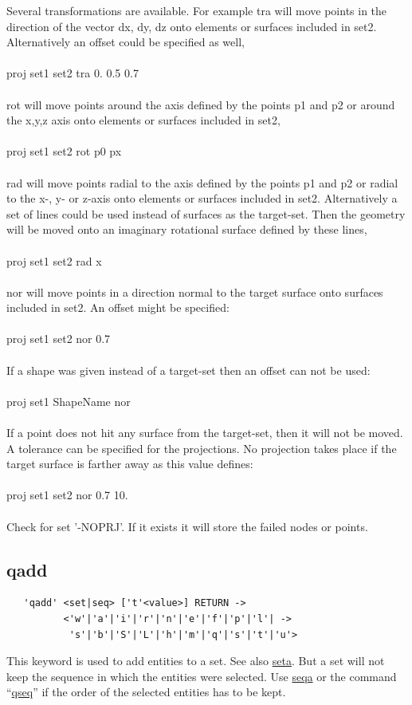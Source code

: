 \documentclass{article}
\providecommand{\htmlref}[2]{\hyperref[#2]{#1}}
\begin{document}
Several transformations are available. For example tra will move points in the direction of the vector dx, dy, dz onto elements or surfaces included in set2. Alternatively an offset could be specified as well,\\\\
proj set1 set2 tra 0. 0.5 0.7  \\\\
rot will move points around the axis defined by the points p1 and p2 or around the x,y,z axis onto elements or surfaces included in set2,\\\\
proj set1 set2 rot p0 px \\\\
rad will move points radial to the axis defined by the points p1 and p2 or radial to the x-, y- or z-axis onto elements or surfaces included in set2. Alternatively a set of lines could be used instead of surfaces as the target-set. Then the geometry will be moved onto an imaginary rotational surface defined by these lines,\\\\
proj set1 set2 rad x \\\\
nor will move points in a direction normal to the target surface onto surfaces included in set2. An offset might be specified:\\\\
proj set1 set2 nor 0.7 \\\\ 
If a shape was given instead of a target-set then an offset can not be used:\\\\
proj set1 ShapeName nor \\\\ 
If a point does not hit any surface from the target-set, then it will not be moved. A tolerance can be specified for the projections. No projection takes place if the target surface is farther away as this value defines:\\\\
proj set1 set2 nor 0.7 10. \\\\

Check for set '-NOPRJ'. If it exists it will store the failed nodes or points.

\subsection{\label{qadd}qadd}
\begin{verbatim}
   'qadd' <set|seq> ['t'<value>] RETURN ->
          <'w'|'a'|'i'|'r'|'n'|'e'|'f'|'p'|'l'| ->
           's'|'b'|'S'|'L'|'h'|'m'|'q'|'s'|'t'|'u'> 
\end{verbatim}
This keyword is used to add entities to a set. See also \htmlref{seta}{seta}. But a set will not keep the sequence in which the entities were selected. Use \htmlref{seqa}{seqa} or the command ``\htmlref{qseq}{qseq}'' if the order of the selected entities has to be kept. 
\end{document}

